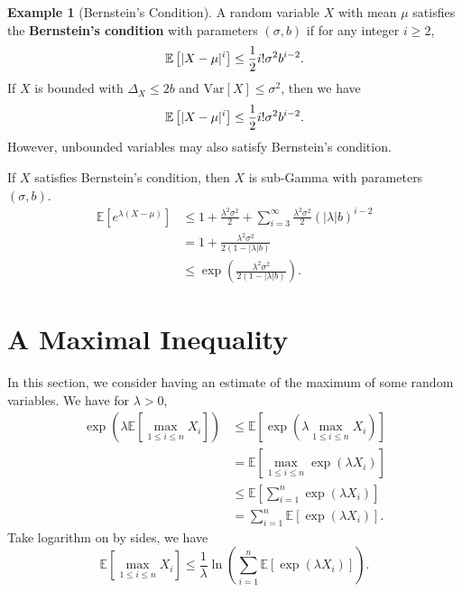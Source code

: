 \documentclass[openany]{book}
\theoremstyle{definition}
\newtheorem{example}{Example}[chapter]
\theoremstyle{remark}
\begin{document}
\begin{example}[Bernstein's Condition]
    A random variable $X$ with mean $\mu$ satisfies the \textbf{Bernstein's condition} with parameters $(\sigma,b)$ if for any integer $i\ge2$,
    \begin{equation*}
        \mathbb{E}\sbr[1]{|X-\mu|^i}\le \frac{1}{2}i!\sigma^2b^{i-2}.
    \end{equation*}
    If $X$ is bounded with $\Delta_X\le2b$ and $\mathrm{Var}[X]\le\sigma^2$, then we have
    \begin{equation*}
        \mathbb{E}\sbr[1]{|X-\mu|^i}\le \frac{1}{2}i!\sigma^2b^{i-2}.
    \end{equation*}
    However, unbounded variables may also satisfy Bernstein's condition.

    If $X$ satisfies Bernstein's condition, then $X$ is sub-Gamma with parameters $(\sigma,b)$.
    \begin{align*}
        \mathbb{E}\left[e^{\lambda(X-\mu)}\right] & \le1+\frac{\lambda^2\sigma^2}{2}+\sum_{i=3}^{\infty}\frac{\lambda^2\sigma^2}{2}(|\lambda|b)^{i-2} \\
         & =1+\frac{\lambda^2\sigma^2}{2(1-|\lambda|b)} \\
         & \le\exp\left(\frac{\lambda^2\sigma^2}{2(1-|\lambda|b)}\right).
    \end{align*}
\end{example}

\section{A Maximal Inequality}
In this section, we consider having an estimate of the maximum of some random variables. We have for $\lambda>0$,
\begin{align*}
    \exp\left(\lambda \mathbb{E}\left[\max_{1\le i\le n}X_i\right]\right) & \le \mathbb{E}\left[\exp\left(\lambda\max_{1\le i\le n}X_i\right)\right] \\
     & =\mathbb{E}\left[\max_{1\le i\le n}\exp(\lambda X_i)\right] \\
     & \le \mathbb{E}\left[\sum_{i=1}^{n}\exp(\lambda X_i)\right] \\
     & =\sum_{i=1}^{n}\mathbb{E}[\exp(\lambda X_i)].
\end{align*}
Take logarithm on by sides, we have
\begin{equation*}
    \mathbb{E}\left[\max_{1\le i\le n}X_i\right]\le \frac{1}{\lambda}\ln\left(\sum_{i=1}^{n}\mathbb{E}[\exp(\lambda X_i)]\right).
\end{equation*}
\end{document}
